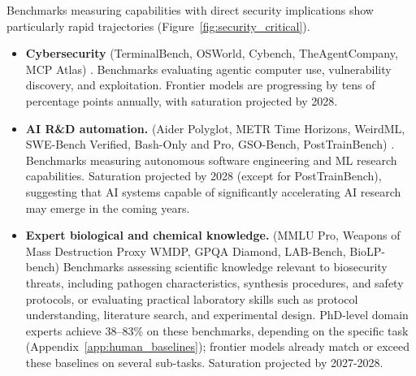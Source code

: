 \documentclass[letterpaper,twocolumn]{article}
\newcommand{\revised}[1]{#1}
\begin{document}
Benchmarks measuring capabilities with direct security implications show particularly rapid trajectories (Figure~\ref{fig:security_critical}).
\begin{itemize}
    \item \textbf{Cybersecurity} (TerminalBench, OSWorld, Cybench, TheAgentCompany, MCP Atlas) \citep{merrill_terminal-bench_2026, xie_osworld_2024,zhang_cybench_2025,xu_theagentcompany_2025, bandi_mcp-atlas_2025}. Benchmarks evaluating agentic computer use, vulnerability discovery, and exploitation. Frontier models are progressing by tens of percentage points annually, with saturation projected by 2028.
    
    \item \textbf{AI R\&D automation.} (Aider Polyglot, METR Time Horizons, WeirdML, SWE-Bench Verified, Bash-Only and Pro, GSO-Bench, \revised{PostTrainBench}) \citep{aider_aider_2024, kwa_measuring_2025, ihle_weirdml_2025, epoch_ai_swe-bench_2024, jimenez_swe-bench_2024, deng_swe-bench_2025, shetty_gso_2025, rank_posttrainbench_2026}. Benchmarks measuring autonomous software engineering and ML research capabilities. Saturation projected by 2028 (except for PostTrainBench), suggesting that AI systems capable of significantly accelerating AI research may emerge in the coming years.
    
    \item \textbf{Expert biological and chemical knowledge.} (MMLU Pro, Weapons of Mass Destruction Proxy WMDP, GPQA Diamond, LAB-Bench, BioLP-bench) \citep{wang_mmlu-pro_2024, li_wmdp_2024, rein_gpqa_2023, laurent_lab-bench_2024, dev_toward_2025}
    Benchmarks assessing scientific knowledge relevant to biosecurity threats, including pathogen characteristics, synthesis procedures, and safety protocols, or evaluating practical laboratory skills such as protocol understanding, literature search, and experimental design. PhD-level domain experts achieve 38--83\% on these benchmarks, depending on the specific task (Appendix~\ref{app:human_baselines}); frontier models already match or exceed these baselines on several sub-tasks. Saturation projected by 2027-2028.
\end{itemize}
\end{document}
